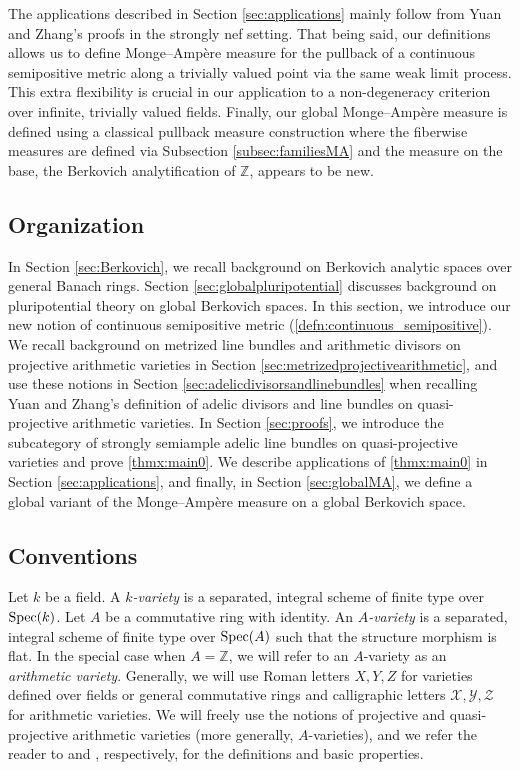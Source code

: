 \documentclass[11pt,reqno]{amsart}
\newcommand{\mZ}{\mathbb{Z}}
\newcommand{\cX}{\mathcal{X}}
\newcommand{\cY}{\mathcal{Y}}
\newcommand{\cZ}{\mathcal{Z}}
\theoremstyle{theorem}
\numberwithin{equation}{subsection}
\numberwithin{equation}{subsection}
\theoremstyle{definition}
\theoremstyle{remark}
\numberwithin{equation}{subsubsection} \numberwithin{figure}{section}
\newcommand{\cdef}[1]{\textsf{\textit{#1}}}
\begin{document}
The applications described in Section \ref{sec:applications} mainly follow from Yuan and Zhang's proofs in the strongly nef setting. 
That being said, our definitions allows us to define Monge--Amp\`ere measure for the pullback of a continuous semipositive metric along a trivially valued point via the same weak limit process. 
This extra flexibility is crucial in our application to a non-degeneracy criterion over infinite, trivially valued fields. 
Finally, our global Monge--Amp\`ere measure is defined using a classical pullback measure construction where the fiberwise measures are defined via Subsection \ref{subsec:familiesMA} and the measure on the base, the Berkovich analytification of $\mZ$, appears to be new. 

\subsection*{Organization}
In Section \ref{sec:Berkovich}, we recall background on Berkovich analytic spaces over general Banach rings. 
Section \ref{sec:globalpluripotential} discusses background on pluripotential theory on global Berkovich spaces. In this section, we introduce our new notion of continuous semipositive metric (\autoref{defn:continuous_semipositive}). 
We recall background on metrized line bundles and arithmetic divisors on projective arithmetic varieties in Section \ref{sec:metrizedprojectivearithmetic}, and use these notions in Section \ref{sec:adelicdivisorsandlinebundles} when recalling Yuan and Zhang's \cite{YuanZhang:AdelicLineBundles} definition of adelic divisors and line bundles on quasi-projective arithmetic varieties. 
In Section \ref{sec:proofs}, we introduce the subcategory of strongly semiample adelic line bundles on quasi-projective varieties and prove \autoref{thmx:main0}. 
We describe applications of \autoref{thmx:main0} in Section \ref{sec:applications}, and finally, in Section \ref{sec:globalMA}, we define a global variant of the Monge--Amp\`ere measure on a global Berkovich space. 

\subsection{Conventions}
\label{subsec:conventions_AG}
Let $k$ be a field. A \cdef{$k$-variety} is a separated, integral scheme of finite type over $\operatorname{Spec}(k)$. 
Let $A$ be a commutative ring with identity. 
An \cdef{$A$-variety} is a separated, integral scheme of finite type over $\operatorname{Spec}(A)$ such that the structure morphism is flat. 
In the special case when $A = \mZ$, we will refer to an $A$-variety as an \cdef{arithmetic variety}. 
Generally, we will use Roman letters $X,Y,Z$ for varieties defined over fields or general commutative rings and calligraphic letters $\cX,\cY,\cZ$ for arithmetic varieties. We will freely use the notions of projective and quasi-projective arithmetic varieties (more generally, $A$-varieties), and we refer the reader to \cite[\href{https://stacks.math.columbia.edu/tag/01W7}{Tag 01W7}]{stacks-project} and \cite[\href{https://stacks.math.columbia.edu/tag/01VV}{Tag 01VV}]{stacks-project}, respectively, for the definitions and basic properties.
\end{document}
